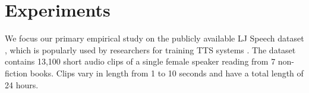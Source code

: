 \documentclass[a4paper]{article}
\begin{document}





\section{Experiments}
\label{sec:experiments}
We focus our primary empirical study on the publicly available LJ Speech dataset \cite{ljspeech}, which is popularly used by researchers for training TTS systems \cite{waveglow,r9y9}. 
The dataset contains 13,100 short audio clips of a single female speaker reading from 7 non-fiction books. Clips vary in length from 1 to 10 seconds and have a total length of 24 hours.
\end{document}
